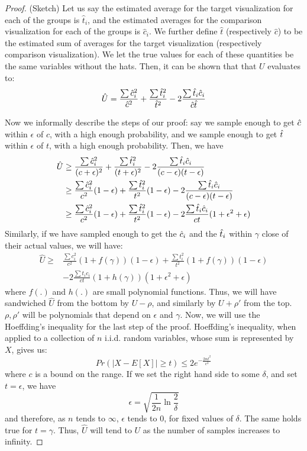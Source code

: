\begin{proof} (Sketch)
Let us say the estimated average for the target visualization
for each of the groups is $\hat{t}_i$,
and the estimated averages for the comparison visualization
for each of the groups is $\hat{c}_i$.
We further define $\hat{t}$ (respectively $\hat{c}$) to be the estimated sum of
averages for the target visualization (respectively comparison visualization).
We let the true values for each of these quantities be the same variables without
the hats.
Then, it can be shown that that $U$ evaluates to:
$$\hat{U} = \frac{\sum{\hc_i^2}}{\hc^2} +  \frac{\sum{\htt_i^2}}{\htt^2} - 2 \frac{\sum{\htt_i \hc_i}}{\hc\htt}$$


Now we informally describe the steps of our proof:
say we sample enough to get $\hat{c}$ within $\epsilon$ of $c$, with a high enough probability,
and we sample enough to get $\hat{t}$ within $\epsilon$ of $t$, with a high enough probability.
Then, we have 
\begin{align*}
\hat{U} & \geq \frac{\sum{\hc_i^2}}{(c + \epsilon)^2} +  \frac{\sum{\htt_i^2}}{(t + \epsilon)^2} - 2 \frac{\sum{\htt_i \hc_i}}{(c - \epsilon) (t - \epsilon)} \\
& \geq \frac{\sum{\hc_i^2}}{c^2} (1 - \epsilon ) +  \frac{\sum{\htt_i^2}}{t ^2} (1-\epsilon) - 2 \frac{\sum{\htt_i \hc_i}}{(c - \epsilon) (t - \epsilon)} \\
& \geq \frac{\sum{\hc_i^2}}{c^2} (1 - \epsilon ) +  \frac{\sum{\htt_i^2}}{t ^2} (1-\epsilon) - 2 \frac{\sum{\htt_i \hc_i}}{ct}(1 + \epsilon^2 + \epsilon) 
\end{align*}
Similarly, if we have sampled enough to get the $\hat{c}_i$ and the $\hat{t}_i$ within $\gamma$ close 
of their actual values, we will have:
\begin{align*}
\hat{U} \geq &  \frac{\sum{c_i^2}}{c^2} (1 + f(\gamma)) (1 - \epsilon ) +   \frac{\sum{t_i^2}}{t ^2}  (1 + f(\gamma)) (1-\epsilon) \\ & - 2 \frac{\sum{t_i c_i}}{ct}(1 + h(\gamma))(1 + \epsilon^2 + \epsilon) 
\end{align*}
where $f(.)$ and $h(.)$ are small polynomial functions.
Thus,
we will have sandwiched $\hat{U}$ from the bottom by $U-\rho$,
and similarly by $U + \rho'$ from the top.
$\rho, \rho'$ will be polynomials that depend on $\epsilon$ and $\gamma$.
Now, we will use the Hoeffding's inequality for the last step of the proof.
Hoeffding's inequality, when
applied to a collection of $n$ i.i.d. random variables,
whose sum is represented by $X$, gives us:
\begin{equation}
Pr (|X - E[X]| \geq t) \leq 2 e^{-\frac{2 n t^2}{c^2}}
\end{equation}
where $c$ is a bound on the range. 
If we set the right hand side to some $\delta$, and set $t = \epsilon$,
we have
$$ \epsilon = \sqrt{\frac{1}{2 n} \ln \frac{2}{\delta}}$$
and therefore, as $n$ tends to $\infty$, $\epsilon$ tends to $0$,
for fixed values of $\delta$.
The same holds true for $t = \gamma$.
Thus, $\hat{U}$ will tend to $U$ as the number of samples
increases to infinity.
\end{proof}
